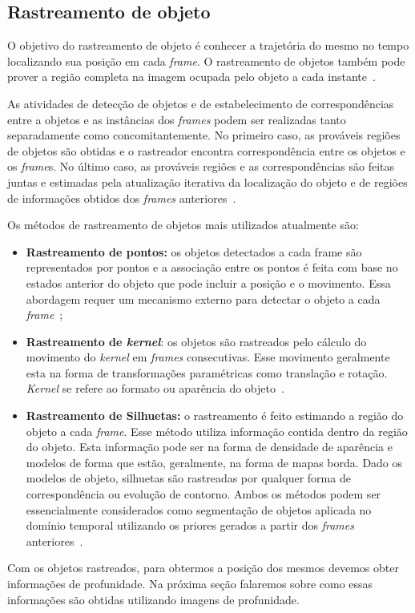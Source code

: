 \subsection{Rastreamento de objeto}

	O objetivo do rastreamento de objeto é conhecer a trajetória do mesmo no tempo localizando sua posição em cada \textit{frame}. O rastreamento de objetos também pode prover a região completa na imagem ocupada pelo objeto a cada instante~\cite{yilmaz}. 

	As atividades de detecção de objetos e de estabelecimento de correspondências entre a objetos e as instâncias dos \textit{frames} podem ser realizadas tanto separadamente como concomitantemente. No primeiro caso, as prováveis regiões de objetos são obtidas e o rastreador encontra correspondência entre os objetos e os \textit{frame}s. No último caso, as prováveis regiões e as correspondências são feitas juntas e estimadas pela atualização iterativa da localização do objeto e de regiões de informações obtidos dos \textit{frames} anteriores~\cite{yilmaz}.

	Os métodos de rastreamento de objetos mais utilizados atualmente são:

	\begin{itemize}
		\item \textbf{Rastreamento de pontos:} os objetos detectados a cada frame são representados por pontos e a associação entre os pontos é feita com base no estados anterior do objeto que pode incluir a posição e o movimento. Essa abordagem requer um mecanismo externo para detectar o objeto a cada \textit{frame}~\cite{yilmaz};

		\item \textbf{Rastreamento de \textit{kernel}}: os objetos são rastreados pelo cálculo do movimento do \textit{kernel} em \textit{frames} consecutivas. Esse movimento geralmente esta na forma de transformações paramétricas como translação e rotação. \textit{Kernel} se refere ao formato ou aparência do objeto~\cite{yilmaz}.

		\item \textbf{Rastreamento de Silhuetas:} o rastreamento é feito estimando a região do objeto a cada \textit{frame}. Esse método utiliza informação contida dentro da região do objeto. Esta informação pode ser na forma de densidade de aparência e modelos de forma que estão, geralmente, na forma de mapas borda. Dado os modelos de objeto, silhuetas são rastreadas por qualquer forma de correspondência ou evolução de contorno. Ambos os métodos podem ser essencialmente considerados como segmentação de objetos aplicada no domínio temporal utilizando os priores gerados a partir dos \textit{frames} anteriores~\cite{yilmaz}.
	\end{itemize}

	Com os objetos rastreados, para obtermos a posição dos mesmos devemos obter informações de profunidade. Na próxima seção falaremos sobre como essas informações são obtidas utilizando imagens de profunidade.





